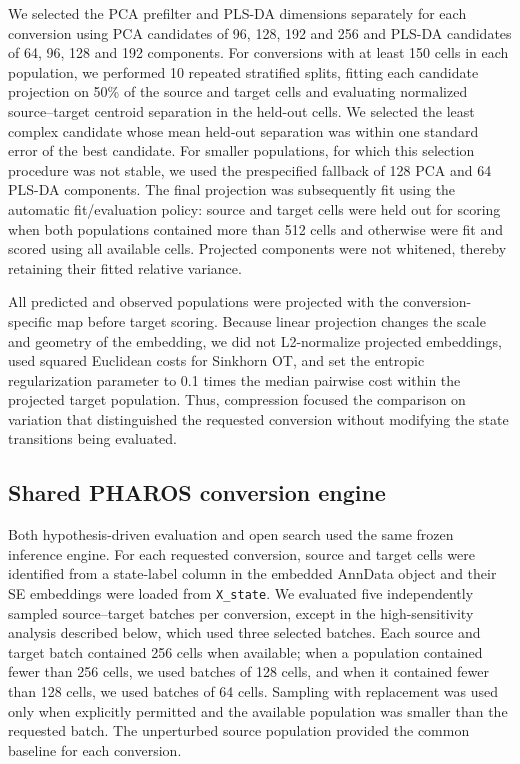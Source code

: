 \documentclass[11pt,a4paper]{article}
\begin{document}
We selected the PCA prefilter and PLS-DA dimensions separately for each conversion using PCA candidates of 96, 128, 192 and 256 and PLS-DA candidates of 64, 96, 128 and 192 components. For conversions with at least 150 cells in each population, we performed 10 repeated stratified splits, fitting each candidate projection on 50\% of the source and target cells and evaluating normalized source--target centroid separation in the held-out cells. We selected the least complex candidate whose mean held-out separation was within one standard error of the best candidate. For smaller populations, for which this selection procedure was not stable, we used the prespecified fallback of 128 PCA and 64 PLS-DA components. The final projection was subsequently fit using the automatic fit/evaluation policy: source and target cells were held out for scoring when both populations contained more than 512 cells and otherwise were fit and scored using all available cells. Projected components were not whitened, thereby retaining their fitted relative variance.

All predicted and observed populations were projected with the conversion-specific map before target scoring. Because linear projection changes the scale and geometry of the embedding, we did not L2-normalize projected embeddings, used squared Euclidean costs for Sinkhorn OT, and set the entropic regularization parameter to 0.1 times the median pairwise cost within the projected target population. Thus, compression focused the comparison on variation that distinguished the requested conversion without modifying the state transitions being evaluated.

\subsection{Shared PHAROS conversion engine}
Both hypothesis-driven evaluation and open search used the same frozen inference engine. For each requested conversion, source and target cells were identified from a state-label column in the embedded AnnData object and their SE embeddings were loaded from \texttt{X\_state}. We evaluated five independently sampled source--target batches per conversion, except in the high-sensitivity analysis described below, which used three selected batches. Each source and target batch contained 256 cells when available; when a population contained fewer than 256 cells, we used batches of 128 cells, and when it contained fewer than 128 cells, we used batches of 64 cells. Sampling with replacement was used only when explicitly permitted and the available population was smaller than the requested batch. The unperturbed source population provided the common baseline for each conversion.
\end{document}
